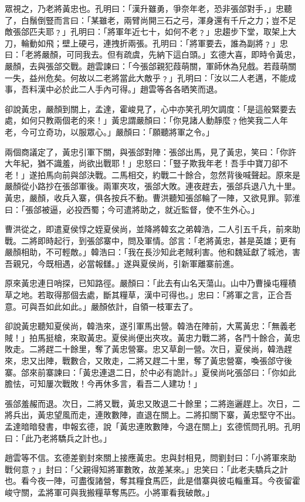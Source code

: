 眾視之，乃老將黃忠也。孔明曰：「漢升雖勇，爭奈年老，恐非張郃對手，」忠聽了，白鬚倒豎而言曰：「某雖老，兩臂尚開三石之弓，渾身還有千斤之力；豈不足敵張郃匹夫耶﹖」孔明曰：「將軍年近七十，如何不老﹖」忠趨步下堂，取架上大刀，輪動如飛；壁上硬弓，連拽折兩張。孔明曰：「將軍要去，誰為副將﹖」忠曰：「老將嚴顏，可同我去。但有疏虞，先納下這白頭。」玄德大喜，即時令黃忠，嚴顏，去與張郃交戰。趙雲諫曰：「今張郃親犯葭萌關，軍師休為兒戲。若葭萌關一失，益州危矣。何故以二老將當此大敵乎﹖」孔明曰：「汝以二人老邁，不能成事，吾料漢中必於此二人手內可得。」趙雲等各各晒笑而退。

卻說黃忠，嚴顏到關上，孟達，霍峻見了，心中亦笑孔明欠調度：「是這般緊要去處，如何只教兩個老的來！」黃忠謂嚴顏曰：「你見諸人動靜麼﹖他笑我二人年老，今可立奇功，以服眾心。」嚴顏曰：「願聽將軍之令。」

兩個商議定了，黃忠引軍下關，與張郃對陣：張郃出馬，見了黃忠，笑曰：「你許大年紀，猶不識羞，尚欲出戰耶！」忠怒曰：「豎子欺我年老！吾手中寶刀卻不老！」遂拍馬向前與郃決戰。二馬相交，約戰二十餘合，忽然背後喊聲起。原來是嚴顏從小路抄在張郃軍後。兩軍夾攻，張郃大敗。連夜趕去，張郃兵退八九十里。黃忠，嚴顏，收兵入寨，俱各按兵不動。曹洪聽知張郃輪了一陣，又欲見罪。郭淮曰：「張郃被逼，必投西蜀；今可遣將助之，就近監督，使不生外心。」

曹洪從之，即遣夏侯惇之姪夏侯尚，並降將韓玄之弟韓浩，二人引五千兵，前來助戰。二將即時起行，到張郃寨中，問及軍情。郃言：「老將黃忠，甚是英雄；更有嚴顏相助，不可輕敵。」韓浩曰：「我在長沙知此老賊利害。他和魏延獻了城池，害吾親兄，今既相遇，必當報讎。」遂與夏侯尚，引新軍離寨前進。

原來黃忠連日哨探，已知路徑。嚴顏曰：「此去有山名天蕩山。山中乃曹操屯糧積草之地。若取得那個去處，斷其糧草，漢中可得也。」忠曰：「將軍之言，正合吾意。可與吾如此如此。」嚴顏依計，自領一枝軍去了。

卻說黃忠聽知夏侯尚，韓浩來，遂引軍馬出營。韓浩在陣前，大罵黃忠：「無義老賊！」拍馬挺槍，來取黃忠。夏侯尚便出夾攻。黃忠力戰二將，各鬥十餘合，黃忠敗走。二將趕二十餘里，奪了黃忠營寨。忠又草創一營。次日，夏侯尚，韓浩趕來，忠又出陣，戰數合，又敗走，二將又趕二十里，奪了黃忠營寨，喚張郃守後寨。郃來前寨諫曰：「黃忠連退二日，於中必有詭計。」夏侯尚叱張郃曰：「你如此膽怯，可知屢次戰敗！今再休多言，看吾二人建功！」

張郃羞赧而退。次日，二將又戰，黃忠又敗退二十餘里；二將迤邐趕上。次日，二將兵出，黃忠望風而走，連敗數陣，直退在關上。二將扣關下寨，黃忠堅守不出。孟達暗暗發書，申報玄德，說「黃忠連敗數陣，今退在關上」玄德慌問孔明。孔明曰：「此乃老將驕兵之計也。」

趙雲等不信。玄德差劉封來關上接應黃忠。忠與封相見，問劉封曰：「小將軍來助戰何意﹖」封曰：「父親得知將軍數敗，故差某來。」忠笑曰：「此老夫驕兵之計也。看今夜一陣，可盡復諸營，奪其糧食馬匹，此是借寨與彼屯輜重耳。今夜留霍峻守關，孟將軍可與我搬糧草奪馬匹。小將軍看我破敵。」


